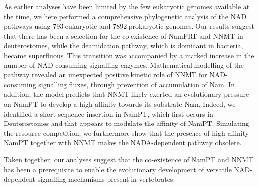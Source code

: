 As earlier analyses have been limited by the few eukaryotic genomes available at the time, we here performed a comprehensive phylogenetic analysis of the NAD pathways using 793 eukaryotic and 7892 prokaryotic genomes. Our results suggest that there has been a selection for the co-existence of NamPRT and NNMT in deuterostomes, while the deamidation pathway, which is dominant in bacteria, became superfluous. This transition was accompanied by a marked increase in the number of NAD-consuming signalling enzymes. Mathematical modelling of the pathway revealed an unexpected positive kinetic role of NNMT for NAD-consuming signalling fluxes, through prevention of accumulation of Nam. In addition, the model predicts that NNMT likely exerted an evolutionary pressure on NamPT to develop a high affinity towards its substrate Nam. Indeed, we identified a short sequence insertion in NamPT, which first occurs in Deuterostomes and that appears to modulate the affinity of NamPT. Simulating the resource competition, we furthermore show that the presence of high affinity NamPT together with NNMT makes the NADA-dependent pathway obsolete.

Taken together, our analyses suggest that the co-existence of NamPT and NNMT has been a prerequisite to enable the evolutionary development of versatile NAD-dependent signalling mechanisms present in vertebrates.
